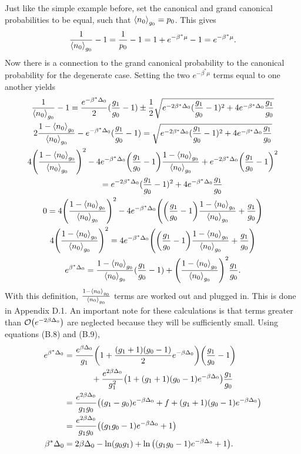 Just like the simple example before, set the canonical and grand canonical probabilities to be equal, such that $\left<{n_0}\right>_{g_0}=p_0$. This gives 
\begin{align}
    \frac{1}{\left<{n_0}\right>_{g_0}}-1=\frac{1}{p_0}-1=1+e^{-\beta^*\mu}-1=e^{-\beta^*\mu} .
\end{align}
Now there is a connection to the grand canonical probability to the canonical probability for the degenerate case. Setting the two $e^{-\beta^*\mu}$ terms equal to one another yields
\begin{gather}
    \frac{1}{\left<{n_0}\right>_{g_0}}-1=\frac{e^{-\beta^*\Delta_0}}{2}(\frac{g_1}{g_0}-1)\pm \frac{1}{2}\sqrt{e^{-2\beta^*\Delta_0} (\frac{g_1}{g_0}-1)^2+ 4e^{-\beta^*\Delta_0}\frac{g_1}{g_0}}\nonumber\\
    2\frac{1-\left<{n_0}\right>_{g_0}}{\left<{n_0}\right>_{g_0}}-e^{-\beta^*\Delta_0}(\frac{g_1}{g_0}-1)=\sqrt{e^{-2\beta^*\Delta_0} (\frac{g_1}{g_0}-1)^2+ 4e^{-\beta^*\Delta_0}\frac{g_1}{g_0}}\nonumber\\
    4\qty(\frac{1-\left<{n_0}\right>_{g_0}}{\left<{n_0}\right>_{g_0}})^2-4e^{-\beta^*\Delta_0}\qty(\frac{g_1}{g_0}-1) \frac{1-\left<{n_0}\right>_{g_0}}{\left<{n_0}\right>_{g_0}}+e^{-2\beta^*\Delta_0} \qty(\frac{g_1}{g_0}-1)^2\nonumber\\ 
    \ \ \ \ \ \ \  =e^{-2\beta^*\Delta_0} (\frac{g_1}{g_0}-1)^2+ 4e^{-\beta^*\Delta_0}\frac{g_1}{g_0} \nonumber\nonumber\\
    0=4\qty(\frac{1-\left<{n_0}\right>_{g_0}}{\left<{n_0}\right>_{g_0}})^2- 4e^{-\beta^*\Delta_0}\qty(\qty(\frac{g_1}{g_0}-1)\frac{1-\left<{n_0}\right>_{g_0}}{\left<{n_0}\right>_{g_0}}+\frac{g_1}{g_0})\nonumber\\
    4\qty(\frac{1-\left<{n_0}\right>_{g_0}}{\left<{n_0}\right>_{g_0}})^2=4e^{-\beta^*\Delta_0}\qty(\qty(\frac{g_1}{g_0}-1)\frac{1-\left<{n_0}\right>_{g_0}}{\left<{n_0}\right>_{g_0}}+\frac{g_1}{g_0})\nonumber\\
    e^{\beta^* \Delta_0}=\frac{1-\left<{n_0}\right>_{g_0}}{\left<{n_0}\right>_{g_0}}(\frac{g_1}{g_0}-1)+\qty(\frac{1-\left<{n_0}\right>_{g_0}}{\left<{n_0}\right>_{g_0}})^2\frac{g_1}{g_0}.
\end{gather}
With this definition, $\frac{1-\left<{n_0}\right>_{g_0}}{\left<{n_0}\right>_{g_0}}$ terms are worked out and plugged in. This is done in Appendix D.1. An important note for these calculations is that terms greater than $\mathcal{O}\qty(e^{-2\beta \Delta_0})$ are neglected because they will be sufficiently small. Using equations (B.8) and (B.9),
\begin{align}
    e^{\beta^* \Delta_0}&=\frac{e^{\beta\Delta_0}}{g_1}\qty(1+\frac{(g_1+1)(g_0-1)}{2}e^{-\beta\Delta_0})\qty(\frac{g_1}{g_0}-1)\nonumber\\
    &\ \ \ \ \ \ \ \ \ \ +\frac{e^{2\beta\Delta_0}}{g_1^2}\qty(1+(g_1+1)(g_0-1)e^{-\beta\Delta_0})\frac{g_1}{g_0}\nonumber\\
    &=\frac{e^{2\beta\Delta_0}}{g_1g_0}\qty((g_1-g_0)e^{-\beta\Delta_0}+f+(g_1+1)(g_0-1)e^{-\beta\Delta_0})\nonumber\\
    &=\frac{e^{2\beta\Delta_0}}{g_1g_0}\qty((g_1g_0-1)e^{-\beta\Delta_0}+1)\\
    \beta^*\Delta_0&=2\beta\Delta_0-\ln(g_0g_1)+\ln\qty((g_1g_0-1)e^{-\beta\Delta_0}+1).
\end{align}
